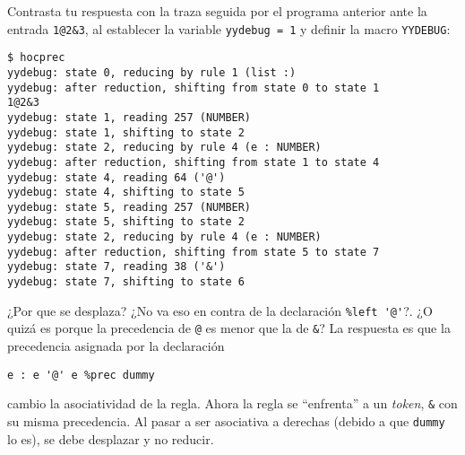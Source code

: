 \begin{example}
Contrasta tu respuesta con la traza seguida por el programa anterior
ante la entrada \verb|1@2&3|, al establecer la variable \verb|yydebug = 1|
y definir la macro \verb|YYDEBUG|:
\begin{execution}
\begin{verbatim}
$ hocprec
yydebug: state 0, reducing by rule 1 (list :)
yydebug: after reduction, shifting from state 0 to state 1
1@2&3
yydebug: state 1, reading 257 (NUMBER)
yydebug: state 1, shifting to state 2
yydebug: state 2, reducing by rule 4 (e : NUMBER)
yydebug: after reduction, shifting from state 1 to state 4
yydebug: state 4, reading 64 ('@')
yydebug: state 4, shifting to state 5
yydebug: state 5, reading 257 (NUMBER)
yydebug: state 5, shifting to state 2
yydebug: state 2, reducing by rule 4 (e : NUMBER)
yydebug: after reduction, shifting from state 5 to state 7
yydebug: state 7, reading 38 ('&')
yydebug: state 7, shifting to state 6
\end{verbatim}
\end{execution}
¿Por  que se desplaza? ¿No va eso en contra de la declaración 
\verb|%left '@'|?.  ¿O quizá es porque la precedencia de \verb|@|
es menor que la de \verb|&|? La respuesta es que la precedencia
asignada por la declaración 
\begin{center}
\verb|e : e '@' e %prec dummy|
\end{center}
cambio la asociatividad de la regla. Ahora la regla se
``enfrenta'' a un \emph{token}, \verb|&| con su misma precedencia.
Al pasar a ser asociativa a derechas (debido a que
\verb|dummy| lo es), se debe desplazar y no reducir.
\end{example}


